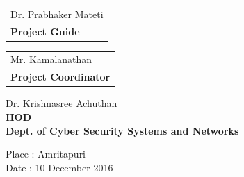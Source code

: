            

\vspace{5pt}
\begin{flushleft}

\begin{tabular}[t]{@{}l} 
  {{Dr. Prabhaker Mateti}}\\  \textbf{Project Guide}
\end{tabular}
\hfill%
\begin{tabular}[t]{l@{}}
   {{Mr. Kamalanathan}}\\\textbf{Project Coordinator}
\end{tabular}
\end{flushleft}
\begin{flushleft}
 

 Dr. Krishnasree Achuthan \hspace{220pt} \\  
 \textbf {HOD\\ Dept. of Cyber Security Systems and Networks\\[4ex]   }

      

\end{flushleft}

\begin{flushleft}

\vspace{5pt}

Place    :    Amritapuri \\

Date    :    10 December 2016

\end{flushleft}

